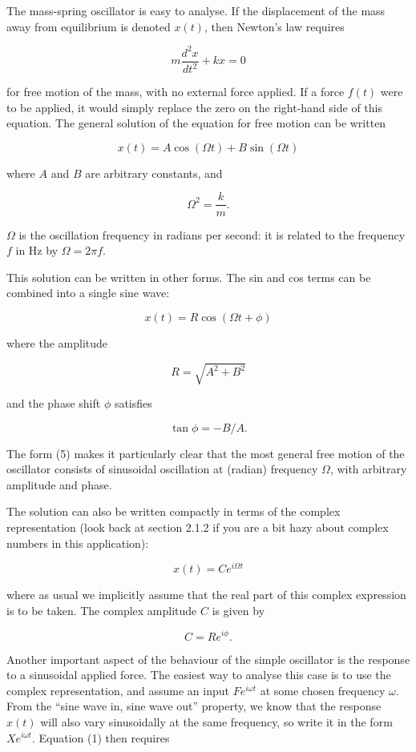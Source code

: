   The mass-spring oscillator is easy to analyse. If the displacement of the 
  mass away from equilibrium is denoted $x(t)$, then Newton's law requires 

  $$m \dfrac{d^2x}{dt^2} + kx=0 \tag{1}$$ 

  for free motion of the mass, with no external force applied. If a force 
  $f(t)$ were to be applied, it would simply replace the zero on the right-hand 
  side of this equation. The general solution of the equation for free motion 
  can be written 

  $$x(t)=A \cos(\Omega t) + B \sin(\Omega t) \tag{2}$$ 

  where $A$ and $B$ are arbitrary constants, and 

  $$\Omega^2=\dfrac{k}{m}. \tag{3}$$ 

  $\Omega$ is the oscillation frequency in radians per second: it is related to 
  the frequency $f$ in Hz by $\Omega = 2 \pi f \tag{4}$. 

  This solution can be written in other forms. The sin and cos terms can be 
  combined into a single sine wave: 

  $$x(t) = R \cos(\Omega t + \phi) \tag{5}$$ 

  where the amplitude 

  $$R = \sqrt{A^2 + B^2} \tag{6}$$ 

  and the phase shift $\phi$ satisfies 

  $$\tan{\phi} = -B/A. \tag{7}$$ 

  The form (5) makes it particularly clear that the most general free motion of 
  the oscillator consists of sinusoidal oscillation at (radian) frequency 
  $\Omega$, with arbitrary amplitude and phase. 

  The solution can also be written compactly in terms of the complex 
  representation (look back at section 2.1.2 if you are a bit hazy about 
  complex numbers in this application): 

  $$x(t)= C e^{i \Omega t} \tag{8}$$ 

  where as usual we implicitly assume that the real part of this complex 
  expression is to be taken. The complex amplitude $C$ is given by 

  $$C=R e^{i \phi}. \tag{9}$$ 

  Another important aspect of the behaviour of the simple oscillator is the 
  response to a sinusoidal applied force. The easiest way to analyse this case 
  is to use the complex representation, and assume an input $Fe^{i \omega t}$ 
  at some chosen frequency $\omega$. From the ``sine wave in, sine wave out'' 
  property, we know that the response $x(t)$ will also vary sinusoidally at the 
  same frequency, so write it in the form $X e^{i \omega t}$. Equation (1) then 
  requires 

